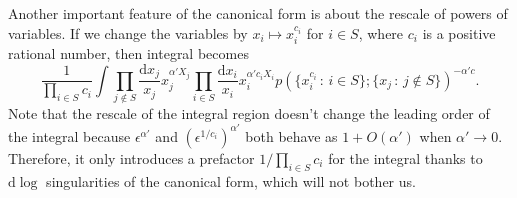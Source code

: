 \documentclass[12pt]{article}
\theoremstyle{definition}
\theoremstyle{plain}
\newcommand{\dif}{\mathrm{d}} %
\begin{document}




Another important feature of the canonical form is about the rescale of powers of variables.
If we change the variables by
\(
	x_i\mapsto x_i^{c_i}
\)
for $i\in S$, where $c_i$ is a positive rational number, then integral becomes
\[
	\frac{1}{\prod_{i\in S}c_i} \int
	\prod_{j\not\in S}\frac{\dif x_j}{x_j}x_j^{\alpha' X_j}
	\prod_{i\in S}\frac{\dif x_i}{x_i}x_i^{\alpha' c_iX_i}
	p(\{x_i^{c_i}\,:\, i\in S\};\{x_j\,:\, j\not\in S\})^{-\alpha' c}.
\]
Note that the rescale of the integral region doesn't change the leading order of the integral
because $\epsilon^{\alpha'}$ and $(\epsilon^{1/c_i})^{\alpha'}$ both behave as $1+O(\alpha')$
when $\alpha'\to 0$. Therefore, it only introduces a prefactor $1/\prod_{i\in S}c_i$ 
for the integral thanks to $\dif \log$ singularities of the canonical form, 
which will not bother us. 
\end{document}
